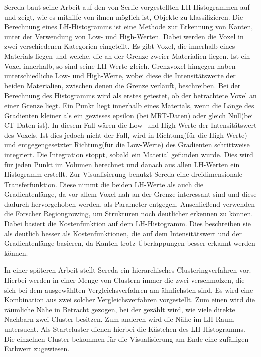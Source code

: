 Sereda baut seine Arbeit \cite{sereda2006visualization} auf den von Serlie \cite{serlie2003computed} vorgestellten LH-Histogrammen auf und zeigt, wie es mithilfe von ihnen möglich ist, Objekte zu klassifizieren.
Die Berechnung eines LH-Histogramms ist eine Methode zur Erkennung von Kanten, unter der Verwendung von Low- und High-Werten. Dabei werden die Voxel in zwei verschiedenen Kategorien eingeteilt.
Es gibt Voxel, die  innerhalb eines Materials liegen und welche, die  an der Grenze zweier Materialien liegen. Ist ein Voxel innerhalb, so sind seine LH-Werte gleich. Grenzvoxel hingegen haben unterschiedliche Low- und High-Werte, wobei diese die Intensitätswerte der beiden Materialien, zwischen denen die Grenze verläuft, beschreiben. 
\newline
Bei der Berechnung des Histogramms wird als erstes getestet, ob der betrachtete Voxel an einer Grenze liegt. Ein Punkt liegt innerhalb eines Materials, wenn  die Länge des Gradienten kleiner als ein gewisses epsilon (bei MRT-Daten) oder gleich Null(bei CT-Daten ist). In diesem Fall wären die Low- und High-Werte der Intensitätswert des Voxels. Ist dies jedoch nicht der Fall, wird in Richtung(für die High-Werte) und entgegengesetzter Richtung(für die Low-Werte) des Gradienten schrittweise integriert. Die Integration stoppt, sobald ein Material gefunden wurde. Dies wird für jeden Punkt im Volumen berechnet und danach aus allen LH-Werten ein Histogramm erstellt.
Zur Visualisierung benutzt Sereda eine dreidimensionale Transferfunktion. Diese nimmt die beiden LH-Werte als auch die Gradientenlänge, da vor allem Voxel nah an der Grenze interessant sind und diese dadurch hervorgehoben werden, als Parameter entgegen.
Anschließend verwenden die Forscher Regiongrowing, um Strukturen noch deutlicher erkennen zu können. Dabei basiert die Kostenfunktion auf dem LH-Histogramm. Dies beschreiben sie als deutlich besser als Kostenfunktionen, die auf dem Intensitätswert und der Gradientenlänge basieren, da Kanten trotz Überlappungen besser erkannt werden können.


In einer späteren Arbeit \cite{sereda2006automating} stellt Sereda ein hierarchisches Clusteringverfahren vor. Hierbei werden in einer Menge von Clustern immer die zwei verschmolzen, die sich bei dem ausgewählten Vergleichsverfahren am ähnlichsten sind. Es wird eine Kombination aus zwei solcher Vergleichsverfahren vorgestellt.
Zum einen wird die räumliche Nähe in Betracht gezogen, bei der gezählt wird, wie viele direkte Nachbarn zwei Cluster besitzen. Zum anderen wird die Nähe im LH-Raum untersucht.
Als Startcluster dienen hierbei die Kästchen des LH-Histogramms. Die einzelnen Cluster bekommen für die Visualisierung am Ende eine zufälligen Farbwert zugewiesen. 


